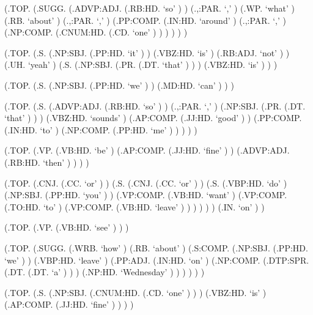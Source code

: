 \documentclass[10pt]{article}
\begin{document}
\begin{parsetree}  (.TOP. (.SUGG. (.ADVP:ADJ. (.RB:HD. `so' ) ) (.,:PAR. `,' ) (.WP. `what' ) (.RB. `about' ) (.,:PAR. `,' ) (.PP:COMP. (.IN:HD. `around' ) (.,:PAR. `,' ) (.NP:COMP. (.CNUM:HD. (.CD. `one' ) ) ) ) ) ) \end{parsetree}

\begin{parsetree}  (.TOP. (.S. (.NP:SBJ. (.PP:HD. `it' ) ) (.VBZ:HD. `is' ) (.RB:ADJ. `not' ) ) (.UH. `yeah' ) (.S. (.NP:SBJ. (.PR. (.DT. `that' ) ) ) (.VBZ:HD. `is' ) ) ) \end{parsetree}

\begin{parsetree}  (.TOP. (.S. (.NP:SBJ. (.PP:HD. `we' ) ) (.MD:HD. `can' ) ) ) \end{parsetree}

\begin{parsetree}  (.TOP. (.S. (.ADVP:ADJ. (.RB:HD. `so' ) ) (.,:PAR. `,' ) (.NP:SBJ. (.PR. (.DT. `that' ) ) ) (.VBZ:HD. `sounds' ) (.AP:COMP. (.JJ:HD. `good' ) ) (.PP:COMP. (.IN:HD. `to' ) (.NP:COMP. (.PP:HD. `me' ) ) ) ) ) \end{parsetree}

\begin{parsetree}  (.TOP. (.VP. (.VB:HD. `be' ) (.AP:COMP. (.JJ:HD. `fine' ) ) (.ADVP:ADJ. (.RB:HD. `then' ) ) ) ) \end{parsetree}

\begin{parsetree}  (.TOP. (.CNJ. (.CC. `or' ) ) (.S. (.CNJ. (.CC. `or' ) ) (.S. (.VBP:HD. `do' ) (.NP:SBJ. (.PP:HD. `you' ) ) (.VP:COMP. (.VB:HD. `want' ) (.VP:COMP. (.TO:HD. `to' ) (.VP:COMP. (.VB:HD. `leave' ) ) ) ) ) ) (.IN. `on' ) ) \end{parsetree}

\begin{parsetree}  (.TOP. (.VP. (.VB:HD. `see' ) ) ) \end{parsetree}

\begin{parsetree}  (.TOP. (.SUGG. (.WRB. `how' ) (.RB. `about' ) (.S:COMP. (.NP:SBJ. (.PP:HD. `we' ) ) (.VBP:HD. `leave' ) (.PP:ADJ. (.IN:HD. `on' ) (.NP:COMP. (.DTP:SPR. (.DT. (.DT. `a' ) ) ) (.NP:HD. `Wednesday' ) ) ) ) ) ) \end{parsetree}

\begin{parsetree}  (.TOP. (.S. (.NP:SBJ. (.CNUM:HD. (.CD. `one' ) ) ) (.VBZ:HD. `is' ) (.AP:COMP. (.JJ:HD. `fine' ) ) ) ) \end{parsetree}
\end{document}
